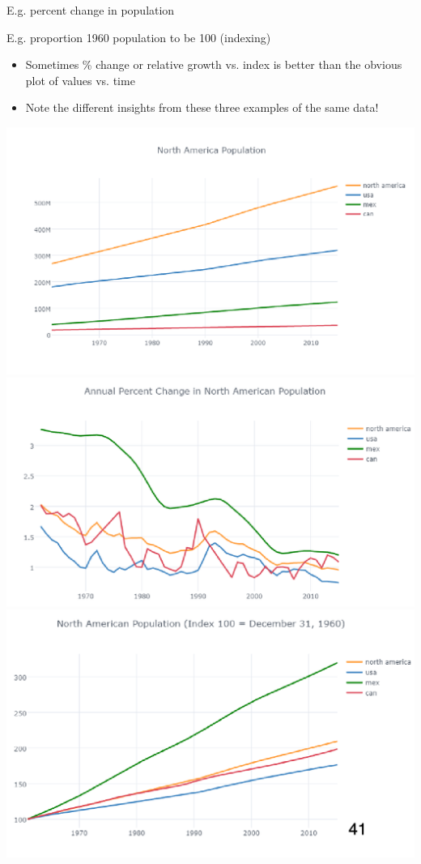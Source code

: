 \documentclass[11pt]{article}
\theoremstyle{definition}
\begin{document}
E.g. percent  change in population 

E.g. proportion 1960 population to be 100 (indexing)

\begin{itemize}
  \item Sometimes \% change or
  relative growth vs. index
  is better than the obvious
  plot of values vs. time
  \item Note the different insights
  from these three examples
  of the same data!
\end{itemize}
\includegraphics[width=\textwidth/2-2.08049pt]{30.png}
\includegraphics[width=\textwidth/2]{31.png}
\includegraphics[width=\textwidth/2]{32.png}
\end{document}
